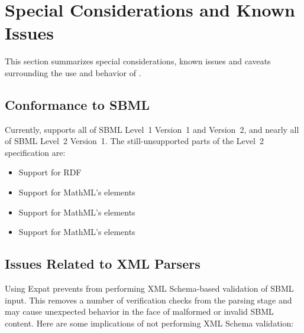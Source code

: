 \documentclass{sbmlmanual}
\begin{document}
\section{Special Considerations and Known Issues}
\label{sec:special-considerations}

This section summarizes special considerations, known issues and caveats
surrounding the use and behavior of \libsbml{}.


\subsection{Conformance to SBML}

Currently, \libsbml{} supports all of SBML Level~1 Version~1 and Version~2,
and nearly all of SBML Level~2 Version~1.  The still-unsupported parts of
the Level~2 specification are:

\begin{itemize}\setlength{\parskip}{-0.25ex}
\item Support for RDF
\item Support for MathML's  elements
\item Support for MathML's  elements
\item Support for MathML's  elements
\end{itemize}


\subsection{Issues Related to XML Parsers}
\label{sec:issues-about-parsers}

Using Expat prevents \libsbml{} from performing XML Schema-based validation
of SBML input.  This removes a number of verification checks from the
parsing stage and may cause unexpected behavior in the face of malformed or
invalid SBML content.  Here are some implications of not performing XML
Schema validation:
\end{document}
